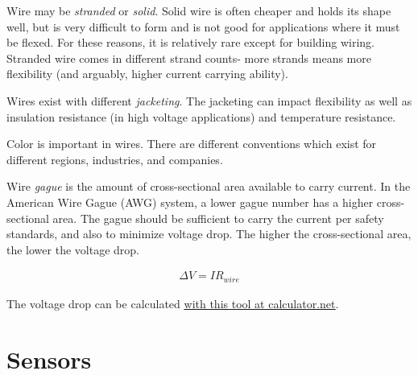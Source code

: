 \begin{asparaenum}
  \item Wire may be \textit{stranded} or \textit{solid}. Solid wire is often cheaper and holds its shape well, but is very difficult to form and is not good for applications where it must be flexed. For these reasons, it is relatively rare except for building wiring. Stranded wire comes in different strand counts- more strands means more flexibility (and arguably, higher current carrying ability).
  \item Wires exist with different \textit{jacketing}. The jacketing can impact flexibility as well as insulation resistance (in high voltage applications) and temperature resistance.
  \item Color is important in wires. There are different conventions which exist for different regions, industries, and companies.
  \item Wire \textit{gague} is the amount of cross-sectional area available to carry current. In the American Wire Gague (AWG) system, a lower gague number has a higher cross-sectional area. The gague should be sufficient to carry the current per safety standards, and also to minimize voltage drop. The higher the cross-sectional area, the lower the voltage drop.
\end{asparaenum}

\begin{align}
  \Delta V = I R_{wire}
\end{align}

The voltage drop can be calculated \href{https://www.calculator.net/voltage-drop-calculator.html}{\color{red}\underline{with this tool at calculator.net}}.

\section{Sensors}

